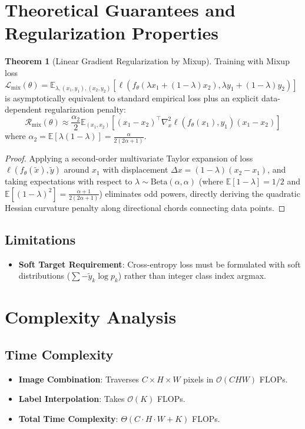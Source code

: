 \documentclass[11pt,a4paper]{article}
\theoremstyle{definition}
\newtheorem{theorem}{Theorem}[section]
\begin{document}
\section{Theoretical Guarantees and Regularization Properties}

\begin{theorem}[Linear Gradient Regularization by Mixup]
Training with Mixup loss $\mathcal{L}_{\text{mix}}(\theta) = \mathbb{E}_{\lambda, (x_1, y_1), (x_2, y_2)} [\ell(f_\theta(\lambda x_1 + (1-\lambda)x_2), \lambda y_1 + (1-\lambda)y_2)]$ is asymptotically equivalent to standard empirical loss plus an explicit data-dependent regularization penalty:
\begin{equation}
\mathcal{R}_{\text{mix}}(\theta) \approx \frac{\alpha_2}{2} \mathbb{E}_{(x_1, x_2)} \left[ (x_1 - x_2)^\top \nabla_x^2 \ell(f_\theta(x_1), y_1) (x_1 - x_2) \right]
\end{equation}
where $\alpha_2 = \mathbb{E}[\lambda(1-\lambda)] = \frac{\alpha}{2(2\alpha + 1)}$.
\end{theorem}

\begin{proof}
Applying a second-order multivariate Taylor expansion of loss $\ell(f_\theta(\tilde{x}), \tilde{y})$ around $x_1$ with displacement $\Delta x = (1-\lambda)(x_2 - x_1)$, and taking expectations with respect to $\lambda \sim \text{Beta}(\alpha, \alpha)$ (where $\mathbb{E}[1-\lambda] = 1/2$ and $\mathbb{E}[(1-\lambda)^2] = \frac{\alpha+1}{2(2\alpha+1)}$) eliminates odd powers, directly deriving the quadratic Hessian curvature penalty along directional chords connecting data points.
\end{proof}

\subsection{Limitations}
\begin{itemize}
    \item \textbf{Soft Target Requirement}: Cross-entropy loss must be formulated with soft distributions ($\sum - \tilde{y}_k \log p_k$) rather than integer class index argmax.
\end{itemize}

\section{Complexity Analysis}

\subsection{Time Complexity}
\begin{itemize}
    \item \textbf{Image Combination}: Traverses $C \times H \times W$ pixels in $\mathcal{O}(C H W)$ FLOPs.
    \item \textbf{Label Interpolation}: Takes $\mathcal{O}(K)$ FLOPs.
    \item \textbf{Total Time Complexity}: $\Theta(C \cdot H \cdot W + K)$ FLOPs.
\end{itemize}
\end{document}
